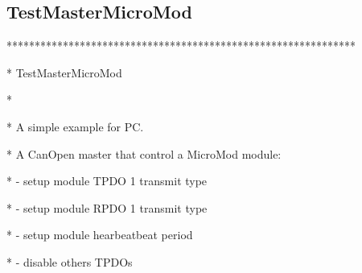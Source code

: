 \documentclass[a4paper,12pt]{book}
\begin{document}
\bigskip

\subsection{TestMasterMicroMod }
{\ttfamily
**************************************************************}

{\ttfamily
* \space TestMasterMicroMod
\space \space \space \space \space \space \space \space \space \space \space \space \space \space \space \space \space \space \space \space \space \space \space \space \space \space \space \space \space \space \space \space \space \space \space \space \space \space \space *}

{\ttfamily
*
\space \space \space \space \space \space \space \space \space \space \space \space \space \space \space \space \space \space \space \space \space \space \space \space \space \space \space \space \space \space \space \space \space \space \space \space \space \space \space \space \space \space \space \space \space \space \space \space \space \space \space \space \space \space \space \space \space \space \space *}

{\ttfamily
* \space A simple example for PC.
\space \space \space \space \space \space \space \space \space \space \space \space \space \space \space \space \space \space \space \space \space \space \space \space \space \space \space \space \space \space \space \space \space *}

{\ttfamily
* \space A CanOpen master that control a MicroMod module:
\space \space \space \space \space \space \space \space \space *}

{\ttfamily
* \space {}- setup module TPDO 1 transmit type
\space \space \space \space \space \space \space \space \space \space \space \space \space \space \space \space \space \space \space \space \space \space *}

{\ttfamily
* \space {}- setup module RPDO 1 transmit type
\space \space \space \space \space \space \space \space \space \space \space \space \space \space \space \space \space \space \space \space \space \space *}

{\ttfamily
* \space {}- setup module hearbeatbeat period
\space \space \space \space \space \space \space \space \space \space \space \space \space \space \space \space \space \space \space \space \space \space \space *}

{\ttfamily
* \space {}- disable others TPDOs
\space \space \space \space \space \space \space \space \space \space \space \space \space \space \space \space \space \space \space \space \space \space \space \space \space \space \space \space \space \space \space \space \space \space \space *}
\end{document}
